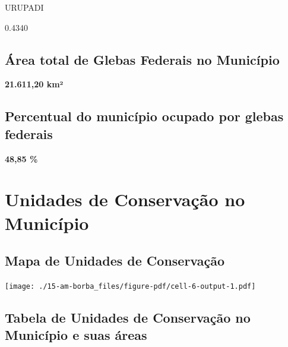 \documentclass[
  letterpaper,
]{report}
\begin{document}
\n      

URUPADI

\n      

0.4340

\n    

\n  

\n

\hypertarget{uxe1rea-total-de-glebas-federais-no-municuxedpio-1}{%
\subsection{Área total de Glebas Federais no
Município}\label{uxe1rea-total-de-glebas-federais-no-municuxedpio-1}}

\textbf{21.611,20 km²}

\hypertarget{percentual-do-municuxedpio-ocupado-por-glebas-federais-1}{%
\subsection{Percentual do município ocupado por glebas
federais}\label{percentual-do-municuxedpio-ocupado-por-glebas-federais-1}}

\textbf{48,85 \%}

\hypertarget{unidades-de-conservauxe7uxe3o-no-municuxedpio-1}{%
\section{Unidades de Conservação no
Município}\label{unidades-de-conservauxe7uxe3o-no-municuxedpio-1}}

\hypertarget{mapa-de-unidades-de-conservauxe7uxe3o-1}{%
\subsection{Mapa de Unidades de
Conservação}\label{mapa-de-unidades-de-conservauxe7uxe3o-1}}

\texttt{[image: ./15-am-borba\_files/figure-pdf/cell-6-output-1.pdf]}

\hypertarget{tabela-de-unidades-de-conservauxe7uxe3o-no-municuxedpio-e-suas-uxe1reas-1}{%
\subsection{Tabela de Unidades de Conservação no Município e suas
áreas}\label{tabela-de-unidades-de-conservauxe7uxe3o-no-municuxedpio-e-suas-uxe1reas-1}}

\n  

\n    
\end{document}
